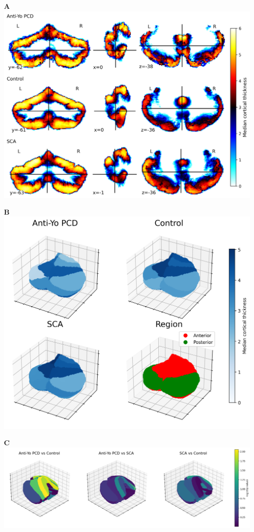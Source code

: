 \documentclass{standalone}
\begin{document}
\begin{minipage}[t]{0.5\textwidth}
    \textbf{A}\\[4pt]
    \includegraphics[width=\textwidth]{graphics/Median_Cortical_Thickness.png}
\end{minipage}
\begin{minipage}[t]{0.45\textwidth}
    \textbf{B}\\[4pt]
    \includegraphics[width=\textwidth]{graphics/stacked_2x2_annotated_legend.png}
\end{minipage}
\begin{minipage}[t]{0.6\textwidth}
    \textbf{C}\\[4pt]
    \includegraphics[width=\textwidth]{graphics/neg_log_p_plot.png}
\end{minipage}
\end{document}
